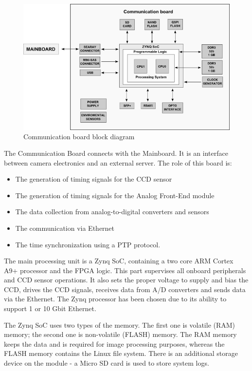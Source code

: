 \begin{figure}[H]
\centering
\includegraphics[width=\textwidth]{pict/commbrd_block.png}
\caption{Communication board block diagram}
\label{fig:commbrd}
\end{figure}

The Communication Board connects with the Mainboard. It is an interface between camera electronics and an external server. The role of this board is:
\begin{itemize}
\item The generation of timing signals for the CCD sensor
\item The generation of timing signals for the Analog Front-End module
\item The data collection from analog-to-digital converters and sensors
\item The communication via Ethernet
\item The time synchronization using a PTP protocol.
\end{itemize}

The main processing unit is a Zynq SoC, containing a two core ARM Cortex A9+ processor and the FPGA logic. This part supervises all onboard peripherals and CCD sensor operations. It also sets the proper voltage to supply and bias the CCD, drives the CCD signals, receives data from A/D converters and sends data via the Ethernet. The Zynq processor has been chosen due to its ability to support 1 or 10 Gbit Ethernet. 

The Zynq SoC uses two types of the memory. The first one is volatile (RAM) memory; the second one is non-volatile (FLASH) memory. The RAM memory keeps the data and is required for image processing purposes, whereas the FLASH memory contains the Linux file system. There is an additional storage device on the module - a Micro SD card is used to store system logs.

